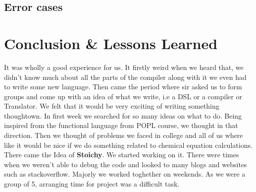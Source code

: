 \documentclass[english,a4paper,12pt]{report}
\begin{document}
        
        
        
        
        
        
        
        
        
        
        
        
        
        
        \newpage
    \section{Error cases}
        
        
        
        
        
        
\chapter{Conclusion \& Lessons Learned}

   It was wholly a good experience for us. It firstly weird when we heard that, we didn't know much about all the parts of the compiler along with it we even had to write some new language. Then came the period where sir asked us to form groups and come up with an idea of what we write, i.e a DSL or a compiler or Translator. We felt that it would be very exciting of writing something thoughtown. In first week we searched for so many ideas on what to do. Being inspired from the functional language from POPL course, we thought in that direction. Then we thought of problems we faced in college and all of us where like it would be nice if we do something related to chemical equation calculations. There came the Idea of \textbf{Stoichy}. We started working on it. There were times when we weren't able to debug the code and looked to many blogs and websites such as stackoverflow. Majorly we worked toghether on weekends. As we were a group of 5, arranging time for project was a difficult task.\\ 
   
\end{document}
